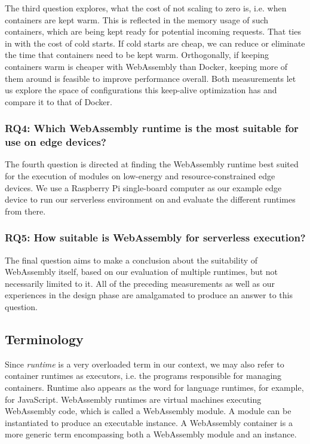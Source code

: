 The third question explores, what the cost of not scaling to zero is, i.e. when containers are kept warm. This is reflected in the memory usage of such containers, which are being kept ready for potential incoming requests. That ties in with the cost of cold starts. If cold starts are cheap, we can reduce or eliminate the time that containers need to be kept warm. Orthogonally, if keeping containers warm is cheaper with WebAssembly than Docker, keeping more of them around is feasible to improve performance overall. Both measurements let us explore the space of configurations this keep-alive optimization has and compare it to that of Docker.

\subsubsection*{RQ4: Which WebAssembly runtime is the most suitable for use on edge devices?}

The fourth question is directed at finding the WebAssembly runtime best suited for the execution of modules on low-energy and resource-constrained edge devices. We use a Raspberry Pi single-board computer as our example edge device to run our serverless environment on and evaluate the different runtimes from there.

\subsubsection*{RQ5: How suitable is WebAssembly for serverless execution?}

The final question aims to make a conclusion about the suitability of WebAssembly itself, based on our evaluation of multiple runtimes, but not necessarily limited to it. All of the preceding measurements as well as our experiences in the design phase are amalgamated to produce an answer to this question.

\subsection{Terminology}

Since \emph{runtime} is a very overloaded term in our context, we may also refer to container runtimes as executors, i.e. the programs responsible for managing containers. Runtime also appears as the word for language runtimes, for example,  for JavaScript.
WebAssembly runtimes are virtual machines executing WebAssembly code, which is called a WebAssembly module. A module can be instantiated to produce an executable instance. A WebAssembly container is a more generic term encompassing both a WebAssembly module and an instance.


